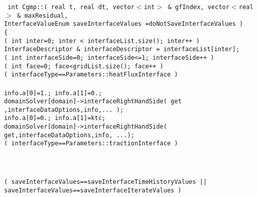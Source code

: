 \begin{flushleft}\tt\small
int Cgmp::( real t, real dt, vector$<$int$>$ \& gfIndex, vector$<$real$>$ \& maxResidual, \\
               \qquad        InterfaceValueEnum saveInterfaceValues =doNotSaveInterfaceValues ) \\
\{  \\
\ia \FOR( int inter=0; inter < interfaceList.size(); inter++ )  \\
\ib    InterfaceDescriptor \& interfaceDescriptor = interfaceList[inter]; \\
\ib    \FOR( int interfaceSide=0; interfaceSide<=1; interfaceSide++ )  \\
\ic       \FOR( int face=0; face<gridList.size(); face++ )   \\
\id         \IF( interfaceType==Parameters::heatFluxInterface ) \\
\ie           {} \\
\ie           info.a[0]=1.; info.a[1]=0.;   \\  
\ie           domainSolver[domain]->interfaceRightHandSide( {\green get} ,interfaceDataOptions,info,... ); \\
\ie           info.a[0]=0.; info.a[1]=ktc;  \\ 
\ie           domainSolver[domain]->interfaceRightHandSide( {\green get},interfaceDataOptions,info, ...); \\
\id         \ELSEIF( interfaceType==Parameters::tractionInterface ) \\
\ie           {} \\
\id        \END \\
\id        \\
\id        \IF( saveInterfaceValues==saveInterfaceTimeHistoryValues || \\
\id            \qquad saveInterfaceValues==saveInterfaceIterateValues ) \\
\ie           {}  \\
\id        \END \\
\id \\
\ic      \END {} \\
\ib    \END \\
\ia \END \\
\ia {} \\

\end{flushleft}
